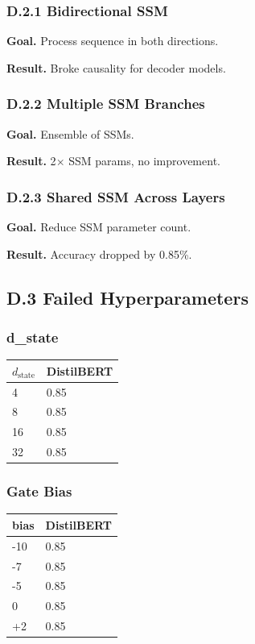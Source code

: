 \subsubsection{D.2.1 Bidirectional SSM}

\textbf{Goal.} Process sequence in both directions.

\textbf{Result.} Broke causality for decoder models.

\subsubsection{D.2.2 Multiple SSM Branches}

\textbf{Goal.} Ensemble of SSMs.

\textbf{Result.} 2$\times$ SSM params, no improvement.

\subsubsection{D.2.3 Shared SSM Across Layers}

\textbf{Goal.} Reduce SSM parameter count.

\textbf{Result.} Accuracy dropped by 0.85\%.

\subsection{D.3 Failed Hyperparameters}

\subsubsection{d\_state}

\begin{table}[H]
\centering
\small
\begin{tabular}{ll}
\toprule
\textbf{$d_\text{state}$} & \textbf{DistilBERT} \\
\midrule
4 & 0.85 \\
8 & 0.85 \\
16 & 0.85 \\
32 & 0.85 \\
\bottomrule
\end{tabular}
\end{table}

\subsubsection{Gate Bias}

\begin{table}[H]
\centering
\small
\begin{tabular}{ll}
\toprule
\textbf{bias} & \textbf{DistilBERT} \\
\midrule
-10 & 0.85 \\
-7 & 0.85 \\
-5 & 0.85 \\
0 & 0.85 \\
+2 & 0.85 \\
\bottomrule
\end{tabular}
\end{table}

